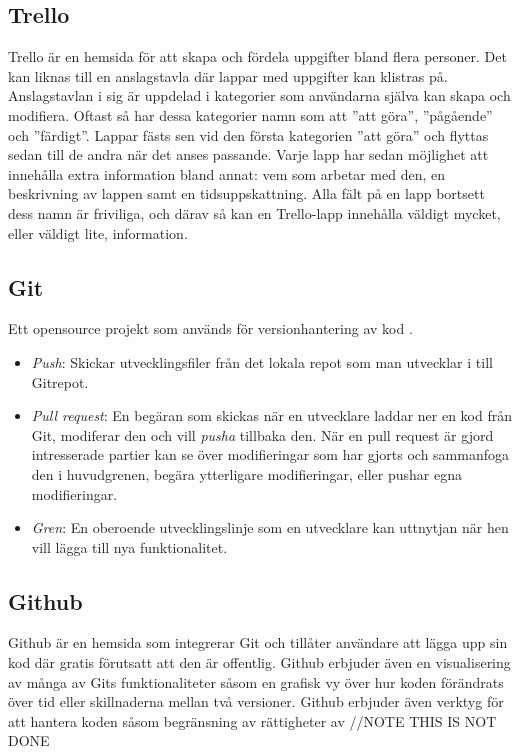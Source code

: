 \subsection*{Trello}
Trello är en hemsida för att skapa och fördela uppgifter bland flera personer. Det kan liknas till en anslagstavla där lappar med uppgifter kan klistras på. Anslagstavlan i sig är uppdelad i kategorier som användarna själva kan skapa och modifiera. Oftast så har dessa kategorier namn som att ''att göra'', ''pågående'' och ''färdigt''. Lappar fästs sen vid den första kategorien ''att göra'' och flyttas sedan till de andra när det anses passande. Varje lapp har sedan möjlighet att innehålla extra information bland annat: vem som arbetar med den, en beskrivning av lappen samt en tidsuppskattning. Alla fält på en lapp bortsett dess namn är friviliga, och därav så kan en Trello-lapp innehålla väldigt mycket, eller väldigt lite, information.

\subsection{Git}
Ett opensource projekt som används för versionhantering av kod \cite{Git52:online}.
\begin{itemize}
	\item \textit{Push}: Skickar utvecklingsfiler från det lokala repot som man utvecklar i till Gitrepot.
	\item \textit{Pull request}: En begäran som skickas när en utvecklare laddar ner en kod från Git, modiferar den och vill \textit{pusha} tillbaka den. När en pull request är gjord intresserade partier kan se över modifieringar som har gjorts och sammanfoga den i huvudgrenen, begära ytterligare modifieringar, eller pushar egna modifieringar. 
	\item \textit{Gren}: En oberoende utvecklingslinje som en utvecklare kan uttnytjan när hen vill lägga till nya funktionalitet. 
\end{itemize}

\subsection*{Github}
Github är en hemsida som integrerar Git och tillåter användare att lägga upp sin kod där gratis förutsatt att den är offentlig. Github erbjuder även en visualisering av många av Gits funktionaliteter såsom en grafisk vy över hur koden förändrats över tid eller skillnaderna mellan två versioner. Github erbjuder även verktyg för att hantera koden såsom begränsning av rättigheter av //NOTE THIS IS NOT DONE 

